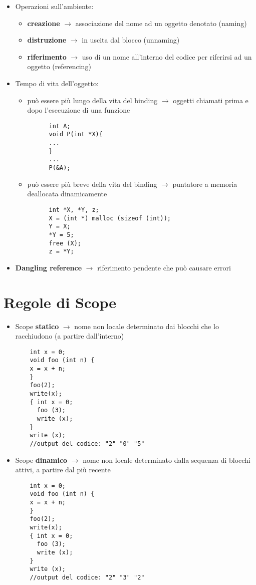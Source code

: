 \documentclass{article}
\begin{document}
\begin{itemize}
  \newpage

  \item Operazioni sull'ambiente:
  \begin{itemize}
    \item \textbf{creazione} $\rightarrow$ associazione del nome ad un oggetto denotato (naming)
    \item \textbf{distruzione} $\rightarrow$ in uscita dal blocco (unnaming)
    \item \textbf{riferimento} $\rightarrow$ uso di un nome all'interno del codice per riferirsi ad un oggetto (referencing)
  \end{itemize}
  \item Tempo di vita dell'oggetto:
  \begin{itemize}
    \item può essere più lungo della vita del binding $\rightarrow$ oggetti chiamati prima e dopo l'esecuzione di una funzione
    \begin{lstlisting}
      int A;
      void P(int *X){
      ...
      }
      ...
      P(&A);
    \end{lstlisting}
    \item può essere più breve della vita del binding $\rightarrow$ puntatore a memoria deallocata dinamicamente
    \begin{lstlisting}
      int *X, *Y, z;
      X = (int *) malloc (sizeof (int));
      Y = X;
      *Y = 5;
      free (X);
      z = *Y;       
    \end{lstlisting}
  \end{itemize} 
  \item \textbf{Dangling reference} $\rightarrow$ riferimento pendente che può causare errori
\end{itemize}

\section*{Regole di Scope}
\begin{itemize}
  \item Scope \textbf{statico} $\rightarrow$ nome non locale determinato dai blocchi che lo racchiudono (a partire dall'interno)
  \begin{lstlisting}
    int x = 0;
    void foo (int n) {
    x = x + n;
    }
    foo(2);
    write(x);
    { int x = 0;
      foo (3);
      write (x);
    }
    write (x);
    //output del codice: "2" "0" "5"

  \end{lstlisting}
  \item Scope \textbf{dinamico} $\rightarrow$ nome non locale determinato dalla sequenza di blocchi attivi, a partire dal più recente
  \begin{lstlisting}
    int x = 0;
    void foo (int n) {
    x = x + n;
    }
    foo(2);
    write(x);
    { int x = 0;
      foo (3);
      write (x);
    }
    write (x);
    //output del codice: "2" "3" "2"
  \end{lstlisting}

  \newpage

\end{itemize}
\end{document}
